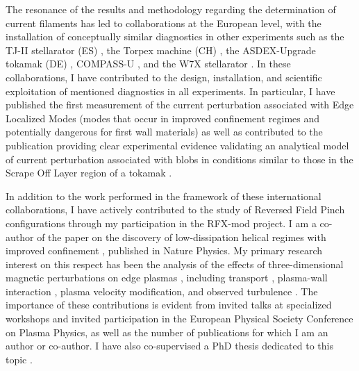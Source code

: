 The resonance of the results and methodology regarding the
determination of current filaments has led to collaborations at the
European level, with the installation of conceptually similar diagnostics in other
experiments such as the TJ-II stellarator (ES) \cite{Spolaore:2015ij},
the Torpex machine (CH) \cite{Furno:2011cs, Fasoli:2013gj,
  0741-3335-53-12-124016}, the ASDEX-Upgrade tokamak (DE)
\cite{PhysRevLett.106.125002, Naulin:2011im}, COMPASS-U
\cite{Spolaore:2016bo, Kovarik:2017bp}, and the W7X stellarator
\cite{Agostinetti:2018bm, spolaore:jinstr2019}. In these
collaborations, I have contributed to the design, installation, and
scientific exploitation of mentioned diagnostics in all
experiments. In particular, I have published the first measurement of
the current perturbation associated with Edge Localized Modes (modes
that occur in improved confinement regimes and potentially dangerous
for first wall materials) \cite{PhysRevLett.106.125002} as well as
contributed to the publication providing clear experimental evidence
validating an analytical model of current perturbation associated with
blobs in conditions similar to those in the Scrape Off Layer region of
a tokamak \cite{Furno:2011cs}.

In addition to the work performed in the framework of these
international collaborations, I have actively contributed to the study
of Reversed Field Pinch configurations through my participation in the
RFX-mod project.  I am a co-author of the paper on the discovery of
low-dissipation helical regimes with improved confinement
\cite{Lorenzini:2009p4248}, published in Nature Physics. My primary
research interest on this respect has been the analysis of the effects of three-dimensional magnetic perturbations on edge plasmas \cite{Vianello:2013jt, Scarin:2013ci, Spizzo:2012hw, Agostini:2014fk}, including transport \cite{Rea:2015he, Vianello:2015ek}, plasma-wall interaction \cite{Scarin:2014dm, DeMasi:go}, plasma velocity modification, and observed turbulence \cite{Ciaccio:2014bo, Spizzo:2014jn}. The importance of these contributions is evident from invited talks at specialized workshops and invited participation in the European Physical Society Conference on Plasma Physics, as well as the number of publications for which I am an author or co-author. I have also co-supervised a PhD thesis dedicated to this topic .

